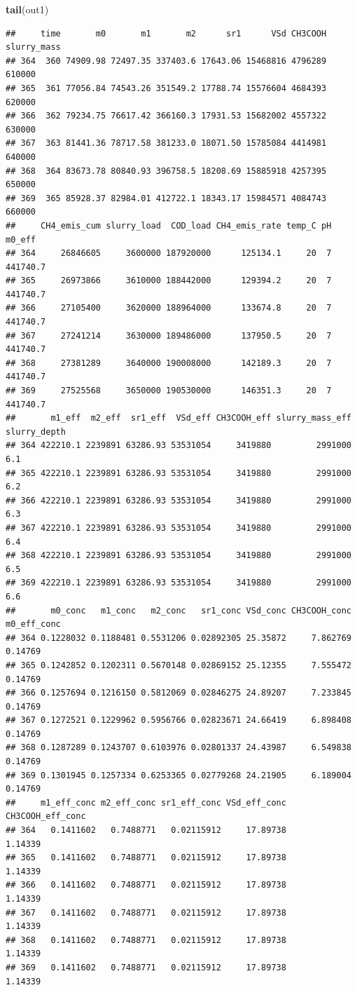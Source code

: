 \documentclass[
]{article}
\newenvironment{Shaded}{\begin{snugshade}}{\end{snugshade}}
\newcommand{\FunctionTok}[1]{\textcolor[rgb]{0.13,0.29,0.53}{\textbf{#1}}}
\newcommand{\NormalTok}[1]{#1}
\begin{document}
\begin{Shaded}
\begin{Highlighting}[]
\FunctionTok{tail}\NormalTok{(out1)}
\end{Highlighting}
\end{Shaded}

\begin{verbatim}
##     time       m0       m1       m2      sr1      VSd CH3COOH slurry_mass
## 364  360 74909.98 72497.35 337403.6 17643.06 15468816 4796289      610000
## 365  361 77056.84 74543.26 351549.2 17788.74 15576604 4684393      620000
## 366  362 79234.75 76617.42 366160.3 17931.53 15682002 4557322      630000
## 367  363 81441.36 78717.58 381233.0 18071.50 15785084 4414981      640000
## 368  364 83673.78 80840.93 396758.5 18208.69 15885918 4257395      650000
## 369  365 85928.37 82984.01 412722.1 18343.17 15984571 4084743      660000
##     CH4_emis_cum slurry_load  COD_load CH4_emis_rate temp_C pH   m0_eff
## 364     26846605     3600000 187920000      125134.1     20  7 441740.7
## 365     26973866     3610000 188442000      129394.2     20  7 441740.7
## 366     27105400     3620000 188964000      133674.8     20  7 441740.7
## 367     27241214     3630000 189486000      137950.5     20  7 441740.7
## 368     27381289     3640000 190008000      142189.3     20  7 441740.7
## 369     27525568     3650000 190530000      146351.3     20  7 441740.7
##       m1_eff  m2_eff  sr1_eff  VSd_eff CH3COOH_eff slurry_mass_eff slurry_depth
## 364 422210.1 2239891 63286.93 53531054     3419880         2991000          6.1
## 365 422210.1 2239891 63286.93 53531054     3419880         2991000          6.2
## 366 422210.1 2239891 63286.93 53531054     3419880         2991000          6.3
## 367 422210.1 2239891 63286.93 53531054     3419880         2991000          6.4
## 368 422210.1 2239891 63286.93 53531054     3419880         2991000          6.5
## 369 422210.1 2239891 63286.93 53531054     3419880         2991000          6.6
##       m0_conc   m1_conc   m2_conc   sr1_conc VSd_conc CH3COOH_conc m0_eff_conc
## 364 0.1228032 0.1188481 0.5531206 0.02892305 25.35872     7.862769     0.14769
## 365 0.1242852 0.1202311 0.5670148 0.02869152 25.12355     7.555472     0.14769
## 366 0.1257694 0.1216150 0.5812069 0.02846275 24.89207     7.233845     0.14769
## 367 0.1272521 0.1229962 0.5956766 0.02823671 24.66419     6.898408     0.14769
## 368 0.1287289 0.1243707 0.6103976 0.02801337 24.43987     6.549838     0.14769
## 369 0.1301945 0.1257334 0.6253365 0.02779268 24.21905     6.189004     0.14769
##     m1_eff_conc m2_eff_conc sr1_eff_conc VSd_eff_conc CH3COOH_eff_conc
## 364   0.1411602   0.7488771   0.02115912     17.89738          1.14339
## 365   0.1411602   0.7488771   0.02115912     17.89738          1.14339
## 366   0.1411602   0.7488771   0.02115912     17.89738          1.14339
## 367   0.1411602   0.7488771   0.02115912     17.89738          1.14339
## 368   0.1411602   0.7488771   0.02115912     17.89738          1.14339
## 369   0.1411602   0.7488771   0.02115912     17.89738          1.14339
\end{verbatim}
\end{document}
